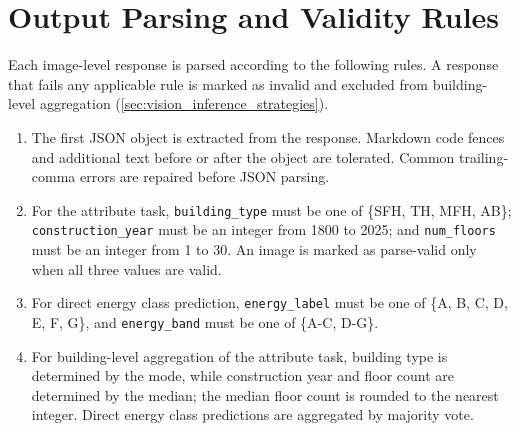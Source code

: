 \section{Output Parsing and Validity Rules}
\label{sec:appendix_c_parsing_rules}

Each image-level response is parsed according to the following rules.
A response that fails any applicable rule is marked as invalid and excluded from building-level aggregation (\cref{sec:vision_inference_strategies}).

\begin{enumerate}
	\item The first JSON object is extracted from the response. Markdown code fences and additional text before or after the object are tolerated. Common trailing-comma errors are repaired before JSON parsing.
	\item For the attribute task, \texttt{building\_type} must be one of \{SFH, TH, MFH, AB\}; \texttt{construction\_year} must be an integer from 1800 to 2025; and \texttt{num\_floors} must be an integer from 1 to 30. An image is marked as parse-valid only when all three values are valid.
	\item For direct energy class prediction, \texttt{energy\_label} must be one of \{A, B, C, D, E, F, G\}, and \texttt{energy\_band} must be one of \{A-C, D-G\}.
	\item For building-level aggregation of the attribute task, building type is determined by the mode, while construction year and floor count are determined by the median; the median floor count is rounded to the nearest integer. Direct energy class predictions are aggregated by majority vote.
\end{enumerate}
